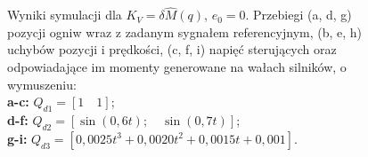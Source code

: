 \documentclass[12pt, a4paper, polish]{article}
\begin{document}
\begin{figure}[H]
{		Wyniki symulacji dla $K_V=\delta\hat{M}(q)$, $e_0=0$. Przebiegi (a, d, g) pozycji ogniw wraz z zadanym sygnałem referencyjnym, (b, e, h) uchybów pozycji i prędkości, (c, f, i)  napięć sterujących oraz odpowiadające im momenty generowane na wałach silników, o wymuszeniu:\\
		\textbf{a-c:} $Q_{d1}=[1\quad1]$;\\
		\textbf{d-f:} $Q_{d2}=[\sin(0,6t);\quad \sin(0,7t)]$;\\
		\textbf{g-i:} $Q_{d3}=[0,0025t^3+0,0020t^2+0,0015t+0,001]$.}
\end{figure}
\end{document}
